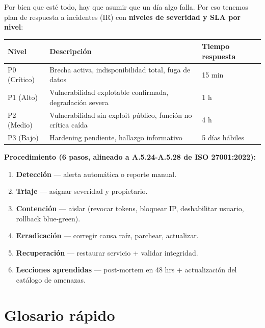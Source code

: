 \documentclass[12pt,a4paper,oneside]{article}
\begin{document}
Por bien que esté todo, hay que asumir que un día algo falla. Por eso tenemos plan de respuesta a incidentes (IR) con \textbf{niveles de severidad y SLA por nivel}:

\begin{table}[h]
\centering
\small
\begin{tabularx}{\textwidth}{lXl}
\toprule
\textbf{Nivel} & \textbf{Descripción} & \textbf{Tiempo respuesta} \\
\midrule
P0 (Crítico) & Brecha activa, indisponibilidad total, fuga de datos & 15 min \\
P1 (Alto) & Vulnerabilidad explotable confirmada, degradación severa & 1 h \\
P2 (Medio) & Vulnerabilidad sin exploit público, función no crítica caída & 4 h \\
P3 (Bajo) & Hardening pendiente, hallazgo informativo & 5 días hábiles \\
\bottomrule
\end{tabularx}
\end{table}

\textbf{Procedimiento (6 pasos, alineado a A.5.24-A.5.28 de ISO 27001:2022):}

\begin{enumerate}[leftmargin=*]
  \item \textbf{Detección} — alerta automática o reporte manual.
  \item \textbf{Triaje} — asignar severidad y propietario.
  \item \textbf{Contención} — aislar (revocar tokens, bloquear IP, deshabilitar usuario, rollback blue-green).
  \item \textbf{Erradicación} — corregir causa raíz, parchear, actualizar.
  \item \textbf{Recuperación} — restaurar servicio + validar integridad.
  \item \textbf{Lecciones aprendidas} — post-mortem en 48 hrs + actualización del catálogo de amenazas.
\end{enumerate}

\section{Glosario rápido}
\end{document}
